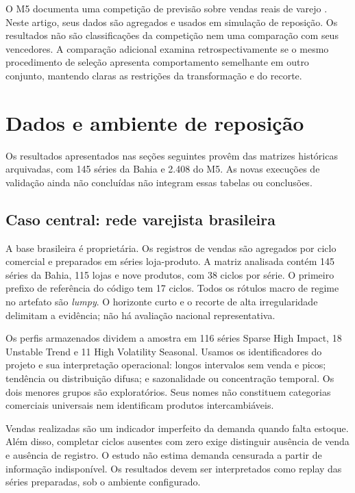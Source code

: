 \documentclass[preprint,12pt]{elsarticle}
\begin{document}
O M5 documenta uma competição de previsão sobre vendas reais de varejo \cite{Makridakis2022M5Accuracy}. Neste artigo, seus dados são agregados e usados em simulação de reposição. Os resultados não são classificações da competição nem uma comparação com seus vencedores. A comparação adicional examina retrospectivamente se o mesmo procedimento de seleção apresenta comportamento semelhante em outro conjunto, mantendo claras as restrições da transformação e do recorte.

\section{Dados e ambiente de reposição}
Os resultados apresentados nas seções seguintes provêm das matrizes históricas arquivadas, com 145 séries da Bahia e 2.408 do M5. As novas execuções de validação ainda não concluídas não integram essas tabelas ou conclusões.
\subsection{Caso central: rede varejista brasileira}
A base brasileira é proprietária. Os registros de vendas são agregados por ciclo comercial e preparados em séries loja-produto. A matriz analisada contém 145 séries da Bahia, 115 lojas e nove produtos, com 38 ciclos por série. O primeiro prefixo de referência do código tem 17 ciclos. Todos os rótulos macro de regime no artefato são \textit{lumpy}. O horizonte curto e o recorte de alta irregularidade delimitam a evidência; não há avaliação nacional representativa.

Os perfis armazenados dividem a amostra em 116 séries Sparse High Impact, 18 Unstable Trend e 11 High Volatility Seasonal. Usamos os identificadores do projeto e sua interpretação operacional: longos intervalos sem venda e picos; tendência ou distribuição difusa; e sazonalidade ou concentração temporal. Os dois menores grupos são exploratórios. Seus nomes não constituem categorias comerciais universais nem identificam produtos intercambiáveis.

Vendas realizadas são um indicador imperfeito da demanda quando falta estoque. Além disso, completar ciclos ausentes com zero exige distinguir ausência de venda e ausência de registro. O estudo não estima demanda censurada a partir de informação indisponível. Os resultados devem ser interpretados como replay das séries preparadas, sob o ambiente configurado.
\end{document}
